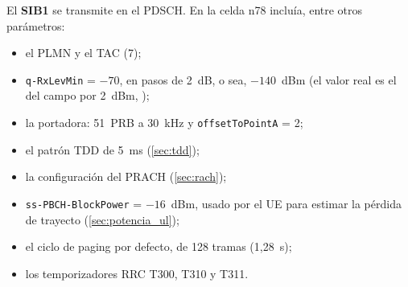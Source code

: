 El \textbf{SIB1} se transmite en el PDSCH. En la celda n78 incluía, entre otros parámetros:
\begin{itemize}
  \item el PLMN y el TAC (7);
  \item \texttt{q-RxLevMin} = $-70$, en pasos de 2~dB, o sea, $-140$~dBm (el valor real es el del campo por 2~dBm, \cite[§6.3.2]{ts38331});
  \item la portadora: 51~PRB a 30~kHz y \texttt{offsetToPointA} = 2;
  \item el patrón TDD de 5~ms (\cref{sec:tdd});
  \item la configuración del PRACH (\cref{sec:rach});
  \item \texttt{ss-PBCH-BlockPower} = $-16$~dBm, usado por el UE para estimar la pérdida de trayecto (\cref{sec:potencia_ul});
  \item el ciclo de paging por defecto, de 128 tramas (1,28~s);
  \item los temporizadores RRC T300, T310 y T311.
\end{itemize}


